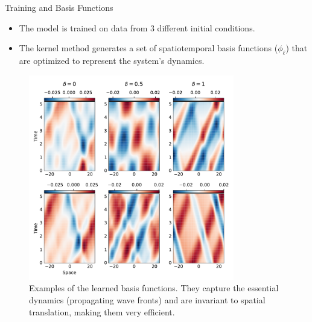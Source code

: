 \documentclass{beamer}
\begin{document}
\begin{frame}{Training and Basis Functions}
    \begin{itemize}
        \item The model is trained on data from 3 different initial conditions.
        \item The kernel method generates a set of spatiotemporal basis functions ($\phi_\ell$) that are optimized to represent the system's dynamics.
    \end{itemize}
    \begin{figure}
        \includegraphics[width=0.8\textwidth]{paper/vsabasis.pdf}
        \caption{Examples of the learned basis functions. They capture the essential dynamics (propagating wave fronts) and are invariant to spatial translation, making them very efficient.}
        \label{fig:vsa-basis}
    \end{figure}
\end{frame}
\end{document}
